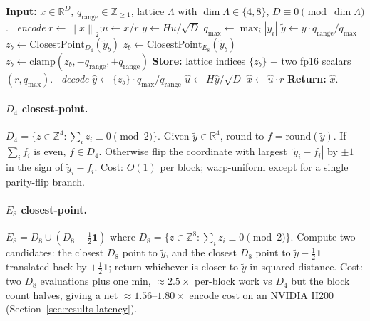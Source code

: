 \documentclass[10pt,a4paper]{article}
\theoremstyle{definition}
\theoremstyle{plain}
\newcommand{\R}{\mathbb{R}}
\newcommand{\Z}{\mathbb{Z}}
\newcommand{\norm}[1]{\left\lVert#1\right\rVert}
\newcommand{\abs}[1]{\left\lvert#1\right\rvert}
\begin{document}
\begin{algorithm}[H]
\caption{\textsc{KakeyaLattice} encode/decode (single vector), parametric in $\Lambda \in \{D_4, E_8\}$}
\label{alg:pipeline}
\begin{algorithmic}[1]
\State \textbf{Input:} $x \in \R^D$, $q_\mathrm{range}\in\Z_{\geq 1}$,
       lattice $\Lambda$ with $\dim\Lambda \in\{4, 8\}$,
       $D \equiv 0 \pmod{\dim\Lambda}$.
\Statex \hrulefill\ \emph{encode} \hrulefill
\State $r \gets \norm{x}_2$;\quad $u \gets x / r$ 
\State $y \gets H u / \sqrt{D}$ 
\State $q_\mathrm{max} \gets \max_i |y_i|$ 
\State $\tilde y \gets y \cdot q_\mathrm{range}/q_\mathrm{max}$ 
    \State $z_b \gets \mathrm{ClosestPoint}_{D_4}(\tilde y_b)$ 
    \State $z_b \gets \mathrm{ClosestPoint}_{E_8}(\tilde y_b)$ 
  \EndIf
  \State $z_b \gets \mathrm{clamp}(z_b, -q_\mathrm{range}, +q_\mathrm{range})$
\EndFor
\State \textbf{Store:} lattice indices $\{z_b\}$ + two fp16 scalars $(r, q_\mathrm{max})$.
\Statex \hrulefill\ \emph{decode} \hrulefill
\State $\hat y \gets \{z_b\} \cdot q_\mathrm{max}/q_\mathrm{range}$ 
\State $\hat u \gets H \hat y / \sqrt{D}$ 
\State $\hat x \gets \hat u \cdot r$ 
\State \textbf{Return:} $\hat x$.
\end{algorithmic}
\end{algorithm}

\paragraph{$D_4$ closest-point.}
$D_4 = \{z \in \Z^4 : \sum_i z_i \equiv 0 \pmod 2\}$. Given
$\tilde y \in \R^4$, round to $f = \mathrm{round}(\tilde y)$. If
$\sum_i f_i$ is even, $f \in D_4$. Otherwise flip the coordinate
with largest $\abs{\tilde y_i - f_i}$ by $\pm 1$ in the sign of
$\tilde y_i - f_i$. Cost: $O(1)$ per block; warp-uniform except for
a single parity-flip branch.

\paragraph{$E_8$ closest-point.}
$E_8 = D_8 \cup (D_8 + \tfrac{1}{2}\mathbf{1})$ where
$D_8 = \{z \in \Z^8 : \sum_i z_i \equiv 0 \pmod 2\}$. Compute two
candidates: the closest $D_8$ point to $\tilde y$, and the closest
$D_8$ point to $\tilde y - \tfrac{1}{2}\mathbf{1}$ translated back
by $+\tfrac{1}{2}\mathbf{1}$; return whichever is closer to
$\tilde y$ in squared distance. Cost: two $D_8$ evaluations plus one
min, $\approx\!2.5\times$ per-block work vs $D_4$ but the block
count halves, giving a net $\approx 1.56$--$1.80\times$ encode cost
on an NVIDIA H200 (Section~\ref{sec:results-latency}).
\end{document}
